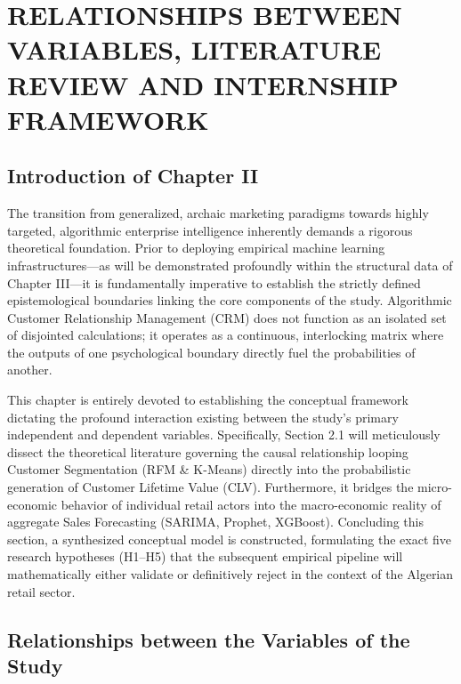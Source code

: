 \documentclass[12pt,a4paper]{report}
\begin{document}
\setcounter{chapter}{1} %
\chapter{RELATIONSHIPS BETWEEN VARIABLES, LITERATURE REVIEW AND INTERNSHIP FRAMEWORK}

\section*{Introduction of Chapter II}
The transition from generalized, archaic marketing paradigms towards highly targeted, algorithmic enterprise intelligence inherently demands a rigorous theoretical foundation. Prior to deploying empirical machine learning infrastructures—as will be demonstrated profoundly within the structural data of Chapter III—it is fundamentally imperative to establish the strictly defined epistemological boundaries linking the core components of the study. Algorithmic Customer Relationship Management (CRM) does not function as an isolated set of disjointed calculations; it operates as a continuous, interlocking matrix where the outputs of one psychological boundary directly fuel the probabilities of another.

This chapter is entirely devoted to establishing the conceptual framework dictating the profound interaction existing between the study’s primary independent and dependent variables. Specifically, Section 2.1 will meticulously dissect the theoretical literature governing the causal relationship looping Customer Segmentation (RFM \& K-Means) directly into the probabilistic generation of Customer Lifetime Value (CLV). Furthermore, it bridges the micro-economic behavior of individual retail actors into the macro-economic reality of aggregate Sales Forecasting (SARIMA, Prophet, XGBoost). Concluding this section, a synthesized conceptual model is constructed, formulating the exact five research hypotheses (H1–H5) that the subsequent empirical pipeline will mathematically either validate or definitively reject in the context of the Algerian retail sector.

\section{Relationships between the Variables of the Study}
\end{document}
